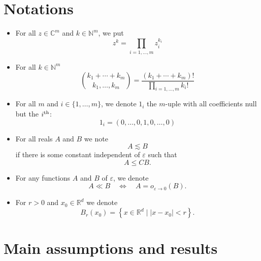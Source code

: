 \documentclass[10pt]{amsart}
\theoremstyle{definition}
\theoremstyle{plain}
\newcommand*\e{\varepsilon}
\newcommand*\R{{\mathbb R}}
\newcommand*\Cbb{{\mathbb C}}%
\newcommand*\N{{\mathbb N}}
\newcommand*\dsp{\displaystyle}
\begin{document}
\section*{Notations}
\begin{itemize}
\item For all $z\in\Cbb^{m}$ and $k\in\N^{m}$, we put
\begin{equation}\label{1.notation.product}
z^{k} = \prod_{i= 1,\ldots,m} z_i^{k_i}
\end{equation}

\item For all $k\in\N^{m}$
\begin{equation}\label{1.notation.binom}
\binom{k_1 + \cdots + k_m}{k_1,\ldots,k_m} = \frac{\dsp (k_1+\cdots+k_m)!}{\dsp \prod_{i= 1,\ldots,m} k_i! }
\end{equation}

\item For all $m$ and $i\in\{1,\ldots,m\}$, we denote $1_{i}$ the $m$-uple with all coefficients null but the $i^{\rm th}$:
\begin{equation}\label{1.notation.1i}
1_{i} = (0,\ldots,0,1,0,\ldots,0)
\end{equation}

\item For all reals $A$ and $B$ we note
\begin{equation}\label{1.notation.lesssim}
A \lesssim B
\end{equation}
if there is some constant independent of $\e$ such that
\[
A \leq C B.
\]

\item For any functions $A$ and $B$ of $\e$, we denote
\begin{equation}\label{1.notation.ll}
A \ll B \quad \Longleftrightarrow \quad A = o_{\e\to0}(B).
\end{equation}

\item For $r>0$ and $x_0\in\R^{d}$ we denote
\begin{equation}\label{1.notation.ball}
B_{r}(x_0) = \left\{x\in\R^{d} \;\big|\; |x-x_0| < r\right\}.
\end{equation}
\end{itemize}

\section{Main assumptions and results}\label{1.section.assumptions}
\end{document}
